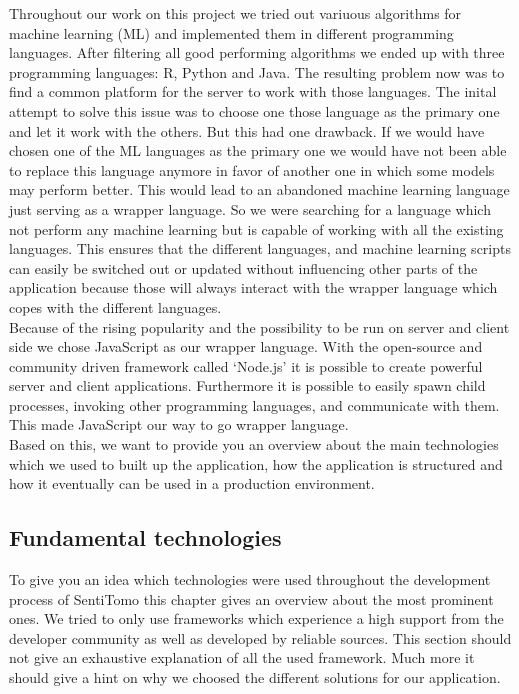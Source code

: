 \documentclass[]{article}
\begin{document}
Throughout our work on this project we tried out variuous algorithms for
machine learning (ML) and implemented them in different programming
languages. After filtering all good performing algorithms we ended up
with three programming languages: R, Python and Java. The resulting
problem now was to find a common platform for the server to work with
those languages. The inital attempt to solve this issue was to choose
one those language as the primary one and let it work with the others.
But this had one drawback. If we would have chosen one of the ML
languages as the primary one we would have not been able to replace this
language anymore in favor of another one in which some models may
perform better. This would lead to an abandoned machine learning
language just serving as a wrapper language. So we were searching for a
language which not perform any machine learning but is capable of
working with all the existing languages. This ensures that the different
languages, and machine learning scripts can easily be switched out or
updated without influencing other parts of the application because those
will always interact with the wrapper language which copes with the
different languages.\\
Because of the rising popularity and the possibility to be run on server
and client side we chose JavaScript as our wrapper language. With the
open-source and community driven framework called `Node.js' it is
possible to create powerful server and client applications. Furthermore
it is possible to easily spawn child processes, invoking other
programming languages, and communicate with them. This made JavaScript
our way to go wrapper language.\\
Based on this, we want to provide you an overview about the main
technologies which we used to built up the application, how the
application is structured and how it eventually can be used in a
production environment.

\subsection{Fundamental technologies}\label{fundamental-technologies}

To give you an idea which technologies were used throughout the
development process of SentiTomo this chapter gives an overview about
the most prominent ones. We tried to only use frameworks which
experience a high support from the developer community as well as
developed by reliable sources. This section should not give an
exhaustive explanation of all the used framework. Much more it should
give a hint on why we choosed the different solutions for our
application.
\end{document}
